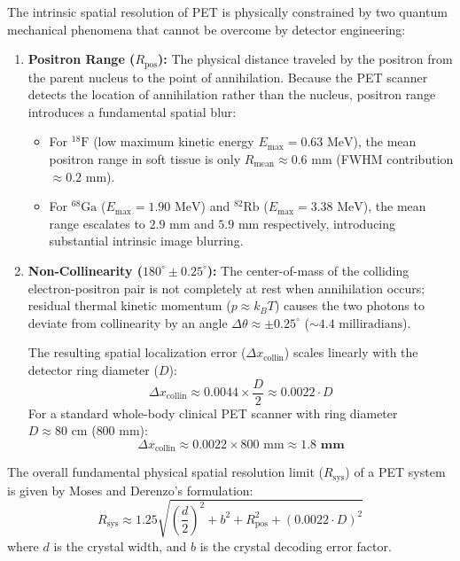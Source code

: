 \documentclass[11pt,a4paper]{article}
\begin{document}
\begin{physicsbox}
The intrinsic spatial resolution of PET is physically constrained by two quantum mechanical phenomena that cannot be overcome by detector engineering:
\begin{enumerate}[leftmargin=1.5em]
    \item \textbf{Positron Range ($R_{\text{pos}}$):} The physical distance traveled by the positron from the parent nucleus to the point of annihilation. Because the PET scanner detects the location of annihilation rather than the nucleus, positron range introduces a fundamental spatial blur:
    \begin{itemize}
        \item For $^{18}\text{F}$ (low maximum kinetic energy $E_{\text{max}} = 0.63\text{ MeV}$), the mean positron range in soft tissue is only $R_{\text{mean}} \approx 0.6\text{ mm}$ (FWHM contribution $\approx 0.2\text{ mm}$).
        \item For $^{68}\text{Ga}$ ($E_{\text{max}} = 1.90\text{ MeV}$) and $^{82}\text{Rb}$ ($E_{\text{max}} = 3.38\text{ MeV}$), the mean range escalates to $2.9\text{ mm}$ and $5.9\text{ mm}$ respectively, introducing substantial intrinsic image blurring.
    \end{itemize}
    \item \textbf{Non-Collinearity ($180^\circ \pm 0.25^\circ$):} The center-of-mass of the colliding electron-positron pair is not completely at rest when annihilation occurs; residual thermal kinetic momentum ($p \approx k_B T$) causes the two photons to deviate from collinearity by an angle $\Delta \theta \approx \pm 0.25^\circ$ ($\sim 4.4\text{ milliradians}$). 

    The resulting spatial localization error ($\Delta x_{\text{collin}}$) scales linearly with the detector ring diameter ($D$):
    \begin{equation}
        \Delta x_{\text{collin}} \approx 0.0044 \times \frac{D}{2} \approx 0.0022 \cdot D
    \end{equation}
    For a standard whole-body clinical PET scanner with ring diameter $D \approx 80\text{ cm}$ ($800\text{ mm}$):
    \begin{equation}
        \Delta x_{\text{collin}} \approx 0.0022 \times 800\text{ mm} \approx \mathbf{1.8\text{ mm}}
    \end{equation}
\end{enumerate}
The overall fundamental physical spatial resolution limit ($R_{\text{sys}}$) of a PET system is given by Moses and Derenzo's formulation:
\begin{equation}
    R_{\text{sys}} \approx 1.25 \sqrt{\left(\frac{d}{2}\right)^2 + b^2 + R_{\text{pos}}^2 + (0.0022 \cdot D)^2}
\end{equation}
where $d$ is the crystal width, and $b$ is the crystal decoding error factor.
\end{physicsbox}
\end{document}
